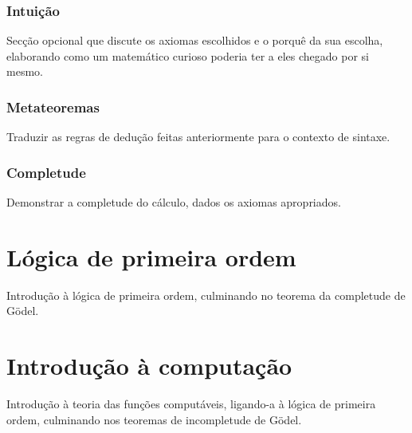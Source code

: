 \documentclass{report}
\theoremstyle{definition}
\theoremstyle{remark}
\begin{document}
	\subsection{Intuição}
	
	Secção opcional que discute os axiomas escolhidos e o porquê da sua escolha, elaborando como um matemático curioso poderia ter a eles chegado por si mesmo.
	
	\subsection{Metateoremas}
	
	Traduzir as regras de dedução feitas anteriormente para o contexto de sintaxe.
	
	\subsection{Completude}
	
	Demonstrar a completude do cálculo, dados os axiomas apropriados.
	
	\chapter{Lógica de primeira ordem}
	
	Introdução à lógica de primeira ordem, culminando no teorema da completude de Gödel.
	
	\chapter{Introdução à computação}
	
	Introdução à teoria das funções computáveis, ligando-a à lógica de primeira ordem, culminando nos teoremas de incompletude de Gödel.
	
\end{document}
